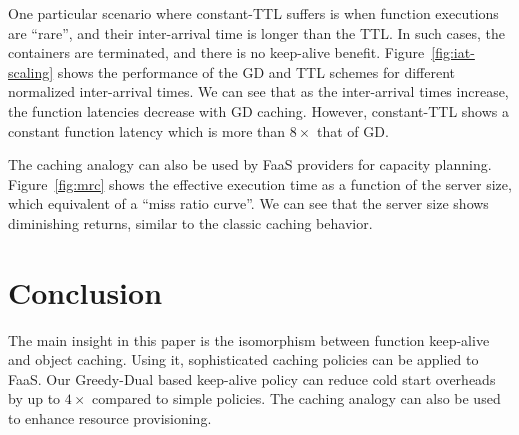

One particular scenario where constant-TTL suffers is when function executions are ``rare'', and their inter-arrival time is longer than the TTL.
In such cases, the containers are terminated, and there is no keep-alive benefit. 
Figure~\ref{fig:iat-scaling} shows the performance of the GD and TTL schemes for different normalized inter-arrival times. 
We can see that as the inter-arrival times increase, the function latencies decrease with GD caching.
However, constant-TTL shows a constant function latency which is more than $8\times$ that of GD.






The caching analogy can also be used by FaaS providers for capacity planning.
Figure~\ref{fig:mrc} shows the effective execution time as a function of the server size, which equivalent of a ``miss ratio curve''.
We can see that the server size shows diminishing returns, similar to the classic caching behavior. 


\vspace*{\subsecspace}
\section{Conclusion}
\vspace*{\subsecspace}

The main insight in this paper is the isomorphism between function keep-alive and object caching.
Using it, sophisticated caching policies can be applied to FaaS.
Our Greedy-Dual based keep-alive policy can reduce cold start overheads by up to $4\times$ compared to simple policies.
The caching analogy can also be used to enhance resource provisioning. 

